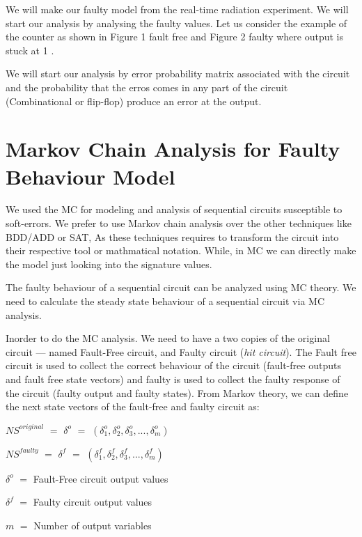 We will make our faulty model from the real-time radiation experiment. We will start our analysis by analysing the faulty values. Let us consider the example of the counter as shown in Figure 1 fault free and Figure 2 faulty where output is stuck at 1 .  


We will start our analysis by error probability matrix associated with the circuit and the probability that the erros comes in any part of the circuit (Combinational or flip-flop) produce an error at the output. 





\section{Markov Chain Analysis for Faulty Behaviour Model}

   
We used the MC for modeling and analysis of sequential circuits susceptible to soft-errors. We prefer to use Markov chain analysis over the other techniques like BDD/ADD or SAT, As these techniques requires to transform the circuit into their respective tool or mathmatical notation. While, in MC we can directly make the model just looking into the signature values. 


The faulty behaviour of a sequential circuit can be analyzed using MC theory. We need to calculate the steady state behaviour of a sequential circuit via MC analysis. 

Inorder to do the MC analysis. We need to have a two copies of the original circuit --- named Fault-Free circuit, and Faulty circuit (\textit{hit circuit}). The Fault free circuit is used to collect the correct behaviour of the circuit (fault-free outputs and fault free state vectors) and faulty is used to collect the faulty response of the circuit (faulty output and faulty states). From Markov theory, we can define the next state vectors of the fault-free and faulty circuit as:




$NS^{original}$ $=$  $\delta^{o}$ $=$ $(\delta^{o}_{1},\delta^{o}_{2},\delta^{o}_{3},...,\delta^{o}_{m})$


$NS^{faulty}$ $=$  $\delta^{f}$ $=$ $(\delta^{f}_{1},\delta^{f}_{2},\delta^{f}_{3},...,\delta^{f}_{m})$


$\delta^{o}$ $=$ Fault-Free circuit output values

$\delta^{f}$ $=$ Faulty circuit output values

$m$ $=$ Number of output variables

